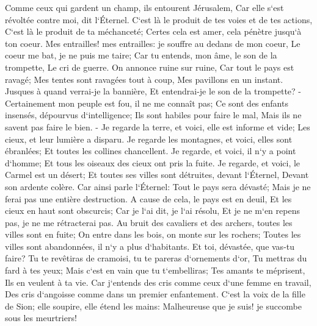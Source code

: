 \verse Comme ceux qui gardent un champ, ils entourent Jérusalem, Car elle s`est révoltée contre moi, dit l`Éternel. 
\verse C`est là le produit de tes voies et de tes actions, C`est là le produit de ta méchanceté; Certes cela est amer, cela pénètre jusqu`à ton coeur. 
\verse Mes entrailles! mes entrailles: je souffre au dedans de mon coeur, Le coeur me bat, je ne puis me taire; Car tu entends, mon âme, le son de la trompette, Le cri de guerre. 
\verse On annonce ruine sur ruine, Car tout le pays est ravagé; Mes tentes sont ravagées tout à coup, Mes pavillons en un instant. 
\verse Jusques à quand verrai-je la bannière, Et entendrai-je le son de la trompette? - 
\verse Certainement mon peuple est fou, il ne me connaît pas; Ce sont des enfants insensés, dépourvus d`intelligence; Ils sont habiles pour faire le mal, Mais ils ne savent pas faire le bien. - 
\verse Je regarde la terre, et voici, elle est informe et vide; Les cieux, et leur lumière a disparu. 
\verse Je regarde les montagnes, et voici, elles sont ébranlées; Et toutes les collines chancellent. 
\verse Je regarde, et voici, il n`y a point d`homme; Et tous les oiseaux des cieux ont pris la fuite. 
\verse Je regarde, et voici, le Carmel est un désert; Et toutes ses villes sont détruites, devant l`Éternel, Devant son ardente colère. 
\verse Car ainsi parle l`Éternel: Tout le pays sera dévasté; Mais je ne ferai pas une entière destruction. 
\verse A cause de cela, le pays est en deuil, Et les cieux en haut sont obscurcis; Car je l`ai dit, je l`ai résolu, Et je ne m`en repens pas, je ne me rétracterai pas. 
\verse Au bruit des cavaliers et des archers, toutes les villes sont en fuite; On entre dans les bois, on monte sur les rochers; Toutes les villes sont abandonnées, il n`y a plus d`habitants. 
\verse Et toi, dévastée, que vas-tu faire? Tu te revêtiras de cramoisi, tu te pareras d`ornements d`or, Tu mettras du fard à tes yeux; Mais c`est en vain que tu t`embelliras; Tes amants te méprisent, Ils en veulent à ta vie. 
\verse Car j`entends des cris comme ceux d`une femme en travail, Des cris d`angoisse comme dans un premier enfantement. C`est la voix de la fille de Sion; elle soupire, elle étend les mains: Malheureuse que je suis! je succombe sous les meurtriers! 

